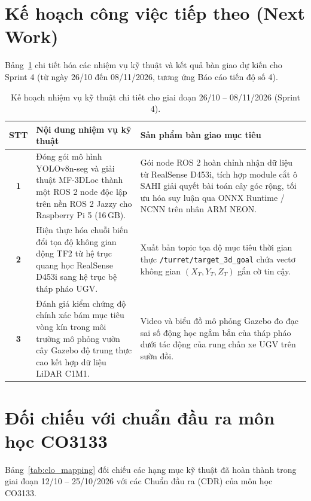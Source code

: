 \documentclass[12pt,a4paper]{article}
\begin{document}
\section{Kế hoạch công việc tiếp theo (Next Work)}

Bảng~\ref{tab:plan} chi tiết hóa các nhiệm vụ kỹ thuật và kết quả bàn giao dự kiến cho Sprint 4 (từ ngày 26/10 đến 08/11/2026, tương ứng Báo cáo tiến độ số 4).

\begin{table}[htbp]
\centering
\small
\caption{Kế hoạch nhiệm vụ kỹ thuật chi tiết cho giai đoạn 26/10 -- 08/11/2026 (Sprint 4).}
\label{tab:plan}
\begin{tabularx}{\textwidth}{c p{7.0cm} X}
\toprule
\textbf{STT} & \textbf{Nội dung nhiệm vụ kỹ thuật} & \textbf{Sản phẩm bàn giao mục tiêu} \\
\midrule
\textbf{1} & Đóng gói mô hình YOLOv8n-seg và giải thuật MF-3DLoc thành một ROS 2 node độc lập trên nền ROS 2 Jazzy cho Raspberry Pi 5 (16\,GB). & Gói node ROS 2 hoàn chỉnh nhận dữ liệu từ RealSense D453i, tích hợp module cắt ô SAHI giải quyết bài toán cây góc rộng, tối ưu hóa suy luận qua ONNX Runtime / NCNN trên nhân ARM NEON. \\
\addlinespace
\textbf{2} & Hiện thực hóa chuỗi biến đổi tọa độ không gian động TF2 từ hệ trục quang học RealSense D453i sang hệ trục bệ tháp pháo UGV. & Xuất bản topic tọa độ mục tiêu thời gian thực \texttt{/turret/target\_3d\_goal} chứa vectơ không gian $(X_T, Y_T, Z_T)$ gắn cờ tin cậy. \\
\addlinespace
\textbf{3} & Đánh giá kiểm chứng độ chính xác bám mục tiêu vòng kín trong môi trường mô phỏng vườn cây Gazebo độ trung thực cao kết hợp dữ liệu LiDAR C1M1. & Video và biểu đồ mô phỏng Gazebo đo đạc sai số động học ngắm bắn của tháp pháo dưới tác động của rung chấn xe UGV trên sườn đồi. \\
\bottomrule
\end{tabularx}
\end{table}

\section{Đối chiếu với chuẩn đầu ra môn học CO3133}

Bảng~\ref{tab:clo_mapping} đối chiếu các hạng mục kỹ thuật đã hoàn thành trong giai đoạn 12/10 -- 25/10/2026 với các Chuẩn đầu ra (CĐR) của môn học CO3133.
\end{document}
